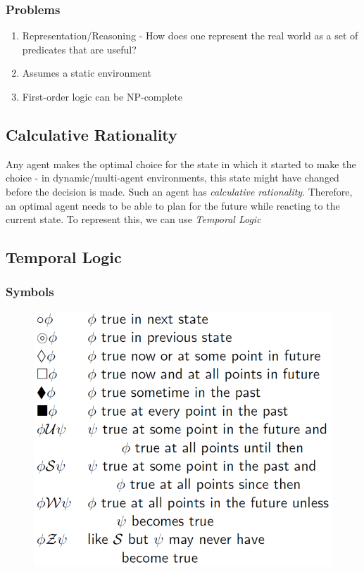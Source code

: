 \subsubsection{Problems}
\begin{enumerate}
    \item Representation/Reasoning - How does one represent the real world as a set of \\ predicates that are useful?
    \item Assumes a static environment
    \item First-order logic can be NP-complete
\end{enumerate}

\subsection{Calculative Rationality}
Any agent makes the optimal choice for the state in which it started to make the choice - in dynamic/multi-agent environments, this state might have changed before the decision is made. Such an agent has \emph{calculative rationality}. 
Therefore, an optimal agent needs to be able to plan for the future while reacting to the current state. To represent this, we can use \emph{Temporal Logic}

\subsection{Temporal Logic}

\subsubsection{Symbols}
\begin{figure}[H]
    \centering
    \includegraphics[width = \textwidth]{Images/Temporal_Logic_Symbols}
\end{figure}

